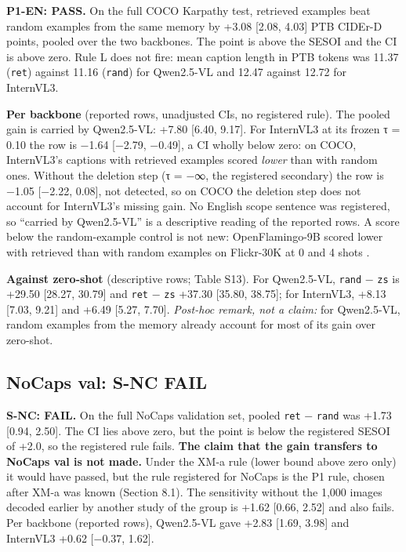 \textbf{P1-EN: PASS.} On the full COCO Karpathy test, retrieved examples beat random examples from
the same memory by +3.08 {[}2.08, 4.03{]} PTB CIDEr-D points, pooled over the two backbones. The
point is above the SESOI and the CI is above zero. Rule L does not fire: mean caption length in PTB
tokens was 11.37 (\texttt{ret}) against 11.16 (\texttt{rand}) for Qwen2.5-VL and 12.47 against 12.72
for InternVL3.

\textbf{Per backbone} (reported rows, unadjusted CIs, no registered rule). The pooled gain is
carried by Qwen2.5-VL: +7.80 {[}6.40, 9.17{]}. For InternVL3 at its frozen τ = 0.10 the row is −1.64
{[}−2.79, −0.49{]}, a CI wholly below zero: on COCO, InternVL3's captions with retrieved examples
scored \emph{lower} than with random ones. Without the deletion step (τ = −∞, the registered
secondary) the row is −1.05 {[}−2.22, 0.08{]}, not detected, so on COCO the deletion step does not
account for InternVL3's missing gain. No English scope sentence was registered, so ``carried by
Qwen2.5-VL'' is a descriptive reading of the reported rows. A score below the random-example control
is not new: OpenFlamingo-9B scored lower with retrieved than with random examples on Flickr-30K at 0
and 4 shots \citep{Awadalla2023OpenFlamingo}.

\textbf{Against zero-shot} (descriptive rows; Table S13). For Qwen2.5-VL, \texttt{rand} −
\texttt{zs} is +29.50 {[}28.27, 30.79{]} and \texttt{ret} − \texttt{zs} +37.30 {[}35.80, 38.75{]};
for InternVL3, +8.13 {[}7.03, 9.21{]} and +6.49 {[}5.27, 7.70{]}. \emph{Post-hoc remark, not a
claim:} for Qwen2.5-VL, random examples from the memory already account for most of its gain over
zero-shot.

\subsection{NoCaps val: S-NC FAIL}\label{nocaps-val-s-nc-fail}

\textbf{S-NC: FAIL.} On the full NoCaps validation set, pooled \texttt{ret} − \texttt{rand} was
+1.73 {[}0.94, 2.50{]}. The CI lies above zero, but the point is below the registered SESOI of +2.0,
so the registered rule fails. \textbf{The claim that the gain transfers to NoCaps val is not made.}
Under the XM-a rule (lower bound above zero only) it would have passed, but the rule registered for
NoCaps is the P1 rule, chosen after XM-a was known (Section 8.1). The sensitivity without the 1,000
images decoded earlier by another study of the group is +1.62 {[}0.66, 2.52{]} and also fails. Per
backbone (reported rows), Qwen2.5-VL gave +2.83 {[}1.69, 3.98{]} and InternVL3 +0.62 {[}−0.37,
1.62{]}.

